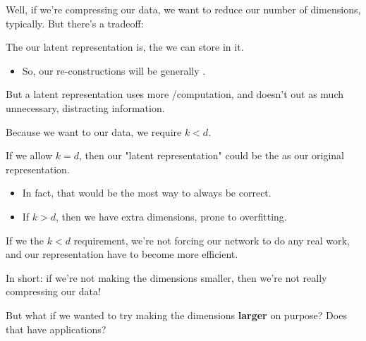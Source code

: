         Well, if we're compressing our data, we want to reduce our number of dimensions, typically. But there's a tradeoff:\\

        \begin{concept}
            The  our latent representation is, the  we can store in it.

            \begin{itemize}
                \item So, our re-constructions will be generally .
            \end{itemize}

            But a  latent representation uses more /computation, and doesn't  out as much unnecessary, distracting information.
        \end{concept}

        \phantom{}

        \begin{clarification}
                Because we want to  our data, we require $k < d$. 

                If we allow $k=d$, then our "latent representation" could be the  as our original representation.
                \begin{itemize}
                    \item In fact, that would be the most  way to always be correct.
                    \item If $k>d$, then we have extra dimensions, prone to overfitting.
                \end{itemize}
    
                If we  the $k<d$ requirement, we're not forcing our network to do any real work, and our representation  have to become more efficient.
            \end{clarification}
    
            In short: if we're not making the dimensions smaller, then we're not really compressing our data!

            But what if we wanted to try making the dimensions \textbf{larger} on purpose? Does that have applications?\\

